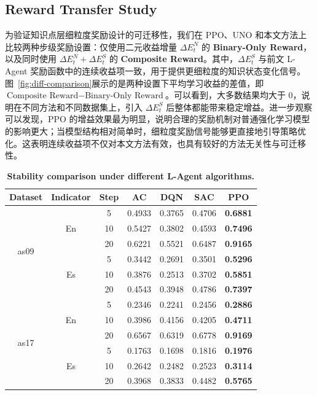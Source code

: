 \documentclass[11pt,a4paper]{article}
\begin{document}
\subsection{Reward Transfer Study}
为验证知识点层细粒度奖励设计的可迁移性，我们在 PPO、UNO 和本文方法上比较两种步级奖励设置：仅使用二元收益增量 $\Delta E_t^{N}$ 的 \textbf{Binary-Only Reward}，以及同时使用 $\Delta E_t^{N}+\Delta E_t^{S}$ 的 \textbf{Composite Reward}。其中，$\Delta E_t^{S}$ 与前文 L-Agent 奖励函数中的连续收益项一致，用于提供更细粒度的知识状态变化信号。图~\ref{fig:diff-comparison}展示的是两种设置下平均学习收益的差值，即 $\text{Composite Reward} - \text{Binary-Only Reward}$。可以看到，大多数结果均大于 0，说明在不同方法和不同数据集上，引入 $\Delta E_t^{S}$ 后整体都能带来稳定增益。进一步观察可以发现，PPO 的增益效果最为明显，说明合理的奖励机制对普通强化学习模型的影响更大；当模型结构相对简单时，细粒度奖励信号能够更直接地引导策略优化。这表明连续收益项不仅对本文方法有效，也具有较好的方法无关性与可迁移性。
\begin{table}[t]
\centering
\captionsetup{labelfont=bf,textfont=bf}
\caption{\textbf{Stability comparison under different L-Agent algorithms.}}
\label{tab:stability_analysis}
\setlength{\tabcolsep}{2.6pt}
\renewcommand{\arraystretch}{1.0}
\scriptsize
\begin{tabular}{ccccccc}
\toprule
\textbf{Dataset} & \textbf{Indicator} & \textbf{Step} & \textbf{AC} & \textbf{DQN} & \textbf{SAC} & \textbf{PPO} \\
\midrule
\multirow[c]{6}{*}{as09} & \multirow[c]{3}{*}{En} & 5  & 0.4933 & 0.3765 & 0.4706 & \textbf{0.6881} \\
 &  & 10 & 0.5427 & 0.3802 & 0.4593 & \textbf{0.7496} \\
 &  & 20 & 0.6221 & 0.5521 & 0.6487 & \textbf{0.9165} \\
\cmidrule(lr){2-7}
 & \multirow[c]{3}{*}{Es} & 5  & 0.3442 & 0.2691 & 0.3501 & \textbf{0.5296} \\
 &  & 10 & 0.3876 & 0.2513 & 0.3702 & \textbf{0.5851} \\
 &  & 20 & 0.4543 & 0.3948 & 0.4786 & \textbf{0.7397} \\
\midrule
\multirow[c]{6}{*}{as17} & \multirow[c]{3}{*}{En} & 5  & 0.2346 & 0.2241 & 0.2456 & \textbf{0.2886} \\
 &  & 10 & 0.3986 & 0.4156 & 0.4205 & \textbf{0.4711} \\
 &  & 20 & 0.6567 & 0.6319 & 0.6778 & \textbf{0.9169} \\
\cmidrule(lr){2-7}
 & \multirow[c]{3}{*}{Es} & 5  & 0.1763 & 0.1698 & 0.1816 & \textbf{0.1976} \\
 &  & 10 & 0.2642 & 0.2482 & 0.2523 & \textbf{0.3114} \\
 &  & 20 & 0.3968 & 0.3833 & 0.4482 & \textbf{0.5765} \\
\bottomrule
\end{tabular}
\end{table}
\end{document}
